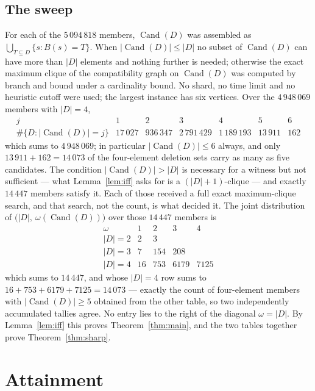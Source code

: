 \documentclass[11pt]{amsart}
\theoremstyle{remark}
\DeclareMathOperator{\Cand}{Cand}
\begin{document}
\subsection*{The sweep}
For each of the $5\,094\,818$ members, $\Cand(D)$ was assembled as
$\bigcup_{T\subseteq D}\{s:B(s)=T\}$. When $|\Cand(D)|\le|D|$ no subset of $\Cand(D)$ can have
more than $|D|$ elements and nothing further is needed; otherwise the exact maximum clique of
the compatibility graph on $\Cand(D)$ was computed by branch and bound under a cardinality
bound. No shard, no time limit and no heuristic cutoff were used; the largest instance has six
vertices. Over the $4\,948\,069$ members with
$|D|=4$,
{\setlength{\arraycolsep}{3pt}
\[
\begin{array}{r|rrrrrr}
 j & 1 & 2 & 3 & 4 & 5 & 6\\\hline
 \#\{D:|\Cand(D)|=j\} & 17\,027 & 936\,347 & 2\,791\,429 & 1\,189\,193 & 13\,911 & 162
\end{array}
\]
}
which sums to $4\,948\,069$; in particular $|\Cand(D)|\le 6$ always, and only
$13\,911+162=14\,073$ of the four-element deletion sets carry as many as five candidates. The
condition $|\Cand(D)|>|D|$ is necessary for a witness but not sufficient --- what
Lemma~\ref{lem:iff} asks for is a $(|D|+1)$-clique --- and exactly $14\,447$ members satisfy
it. Each of those received a full exact maximum-clique search, and that search, not the count,
is what decided it. The joint distribution of $\bigl(|D|,\ \omega(\Cand(D))\bigr)$ over those
$14\,447$ members is
\[
\begin{array}{r|rrrr}
 \omega & 1 & 2 & 3 & 4\\\hline
 |D|=2 & 2 & 3 & & \\
 |D|=3 & 7 & 154 & 208 & \\
 |D|=4 & 16 & 753 & 6179 & 7125
\end{array}
\]
which sums to $14\,447$, and whose $|D|=4$ row sums to $16+753+6179+7125=14\,073$ --- exactly
the count of four-element members with $|\Cand(D)|\ge5$ obtained from the other table, so two
independently accumulated tallies agree. No entry lies to the right of the diagonal
$\omega=|D|$. By Lemma~\ref{lem:iff} this proves Theorem~\ref{thm:main}, and the two tables
together prove Theorem~\ref{thm:sharp}.

\section{Attainment}\label{sec:attain}
\end{document}
